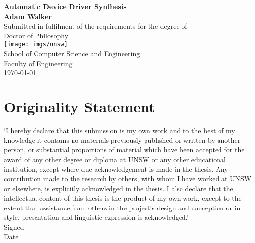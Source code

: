 \documentclass[a4paper,twoside,openright,11pt,oldfontcommands]{memoir}
\theoremstyle{definition}
\begin{document}
\nobibliography*

\frontmatter

\thispagestyle{empty}
\mbox{}
\vfill
\begin{center}
{\Huge\sffamily\textbf{Automatic Device Driver Synthesis}}\\[2cm]
{\Large\sffamily\bfseries Adam Walker}\\[2cm]
Submitted in fulfilment of the requirements for the degree of \\
Doctor of Philosophy\\[1cm]
\texttt{[image: imgs/unsw]} \\[1cm]
School of Computer Science and Engineering \\[0.5cm]
Faculty of Engineering \\[2cm]
\monthyear\today
\end{center}
\par
\vfill
\clearpage

\thispagestyle{plain}
\section*{Originality Statement}

`I hereby declare that this submission is my own work and to the best of my
knowledge it contains no materials previously published or written by another
person, or substantial proportions of material which have been accepted for
the award of any other degree or diploma at UNSW or any other educational
institution, except where due acknowledgement is made in the thesis. Any
contribution made to the research by others, with whom I have worked at UNSW
or elsewhere, is explicitly acknowledged in the thesis.  I also declare that
the intellectual content of this thesis is the product of my own work, except
to the extent that assistance from others in the project's design and
conception or in style, presentation and linguistic expression is
acknowledged.'\\[0.5cm]
Signed\hspace{0.5cm}\dotfill\hfill\\[0.5cm]
Date\hspace{0.5cm}\dotfill\hfill\\
\vfil\newpage
\end{document}
